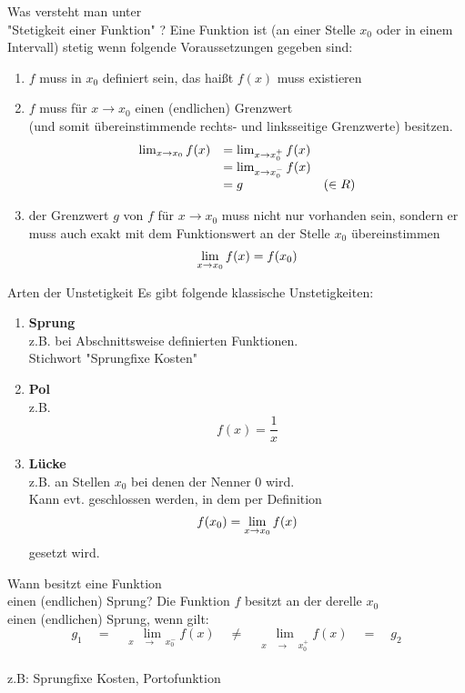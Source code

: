\documentclass[a6paper,12pt,print,grid=none,parskip=half]{kartei}
\begin{document}
\begin{karte}{Was versteht man unter\\ "Stetigkeit einer Funktion"	?}
Eine Funktion ist (an einer Stelle $x_0$ oder in einem Intervall) stetig wenn folgende Voraussetzungen gegeben sind:
\begin{enumerate}
\item $f$ muss in $x_0$ definiert sein, das haißt $f(x)$ muss existieren
\item $f$ muss für $x \rightarrow x_0$ einen (endlichen) Grenzwert \\(und somit übereinstimmende rechts- und linksseitige Grenzwerte) besitzen.
\[\begin{array}{cll}
\lim_{x \rightarrow x_0} f(x) &= \lim_{x \rightarrow x_0^+} f(x) & \\ &= \lim_{x \rightarrow x_0^-} f(x) \\ &= g & (\in R)
\end{array}
\]
\item der Grenzwert $g$ von $f$ für $x \rightarrow x_0$ muss nicht nur vorhanden sein, sondern er muss auch exakt mit dem Funktionswert an der Stelle $x_0$ übereinstimmen
\[\lim_{x \rightarrow x_0} f(x) = f(x_0)
\]
\end{enumerate}
\end{karte}

\begin{karte}{Arten der Unstetigkeit}
Es gibt folgende klassische Unstetigkeiten:
\begin{enumerate}
\item \textbf{Sprung} \\z.B. bei Abschnittsweise definierten Funktionen. \\Stichwort "Sprungfixe Kosten"
\item \textbf{Pol}\\z.B. \[f(x)=\frac { 1 }{ x }\] 
\item \textbf{Lücke} \\z.B. an Stellen $x_0$ bei denen der Nenner 0 wird. \\Kann evt. geschlossen werden, in dem per Definition \[f(x_0) = \lim_{x \rightarrow x_0} f(x)\] gesetzt wird.
\end{enumerate}
\end{karte}

\begin{karte}{Wann besitzt eine Funktion\\ einen (endlichen) Sprung?}
Die Funktion $f$ besitzt an der derelle $x_0$ \\
einen (endlichen) Sprung, wenn gilt:
\[g_{ 1 }\quad =\quad \underset { x\quad \rightarrow \quad { x }_{ 0 }^{ - } }{ \lim   } f(x)\quad \neq \quad \underset { x\quad \rightarrow \quad { x }_{ 0 }^{ + } }{ \lim   } f(x)\quad =\quad g_{ 2 }\]
\\
z.B: Sprungfixe Kosten, Portofunktion
\end{karte}
\end{document}
